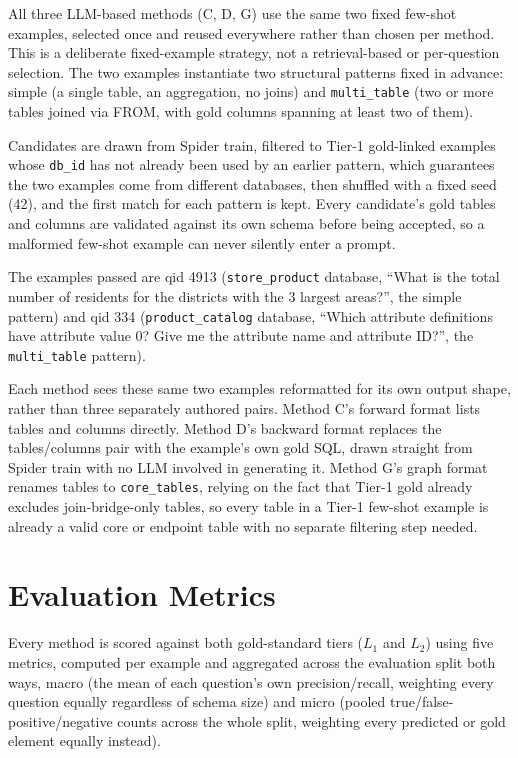 All three LLM-based methods (C, D, G) use the same two fixed few-shot examples, selected once and reused everywhere rather than chosen per method. This is a deliberate fixed-example strategy, not a retrieval-based or per-question selection. The two examples instantiate two structural patterns fixed in advance: simple (a single table, an aggregation, no joins) and \texttt{multi\_table} (two or more tables joined via FROM, with gold columns spanning at least two of them).

Candidates are drawn from Spider train, filtered to Tier-1 gold-linked examples whose \texttt{db\_id} has not already been used by an earlier pattern, which guarantees the two examples come from different databases, then shuffled with a fixed seed (42), and the first match for each pattern is kept. Every candidate's gold tables and columns are validated against its own schema before being accepted, so a malformed few-shot example can never silently enter a prompt.

The examples passed are qid 4913 (\texttt{store\_product} database, ``What is the total number of residents for the districts with the 3 largest areas?'', the simple pattern) and qid 334 (\texttt{product\_catalog} database, ``Which attribute definitions have attribute value 0? Give me the attribute name and attribute ID?'', the \texttt{multi\_table} pattern).

Each method sees these same two examples reformatted for its own output shape, rather than three separately authored pairs. Method C's forward format lists tables and columns directly. Method D's backward format replaces the tables/columns pair with the example's own gold SQL, drawn straight from Spider train with no LLM involved in generating it. Method G's graph format renames tables to \texttt{core\_tables}, relying on the fact that Tier-1 gold already excludes join-bridge-only tables, so every table in a Tier-1 few-shot example is already a valid core or endpoint table with no separate filtering step needed.

\section{Evaluation Metrics}\label{sec:4-5}

Every method is scored against both gold-standard tiers (\ensuremath{L_1} and \ensuremath{L_2}) using five metrics, computed per example and aggregated across the evaluation split both ways, macro (the mean of each question's own precision/recall, weighting every question equally regardless of schema size) and micro (pooled true/false-positive/negative counts across the whole split, weighting every predicted or gold element equally instead).


